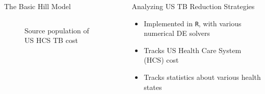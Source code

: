 \documentclass[final]{beamer}
\begin{document}
\begin{frame}
\begin{columns}[T]
\begin{column}{.3\textwidth}
\begin{block}{The Basic Hill Model}
\begin{columns}[T]
\begin{column}{.47\textwidth}
\begin{figure}[h]
\begin{center}
              \end{center}
              \caption{Source population of US HCS TB cost}
              \label{fig:incPlotTotal}
             \end{figure}
           \end{column}
         \end{columns}
       \end{block}
    \end{column}
    
    \begin{column}{.3\textwidth}
      \begin{block}{Analyzing US TB Reduction Strategies}
        \begin{itemize}
          \item Implemented in \texttt{R}, with various numerical DE solvers
          \item Tracks US Health Care System (HCS) cost
          \item Tracks statistics about various health states
        \end{itemize}
      \end{block}


\end{column}
\end{columns}
\end{frame}
\end{document}
